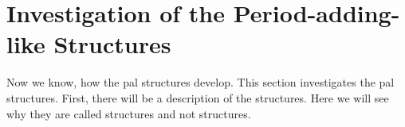 \section{Investigation of the Period-adding-like Structures}
\label{sec:add.add}

Now we know, how the \gls{pal} structures develop.
This section investigates the \gls{pal} structures.
First, there will be a description of the structures.
Here we will see why they are called  structures and not  structures.


\clearpage



